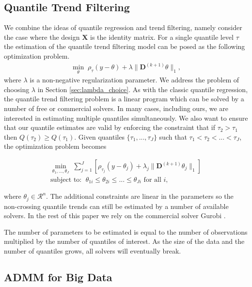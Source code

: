 \documentclass[12pt]{article}
\begin{document}
	\subsection{Quantile Trend Filtering}
	
	We combine the ideas of quantile regression and trend filtering, namely consider the case where the design $\mathbf{X}$ is the identity matrix. For a single quantile level $\tau$ the estimation of the quantile trend filtering model can be posed as the following optimization problem.
	\begin{eqnarray}
	\label{eq:quantile_trend}
	\underset{\theta}{\min}\; \rho_\tau(y - \theta) + \lambda \lVert \mathbf{D}^{(k+1)} \theta \rVert_1,
	\end{eqnarray}
	where $\lambda$ is a non-negative regularization parameter. We address the problem of choosing $\lambda$ in Section \ref{sec:lambda_choice}. As with the classic quantile regression, the quantile trend filtering problem is a linear program which can be solved by a number of free or commercial solvers. In many cases, including ours, we are interested in estimating multiple quantiles simultaneously. We also want to ensure that our quantile estimates are valid by enforcing the constraint that if $\tau_2 > \tau_1$ then $Q(\tau_2) \ge Q(\tau_1)$. Given quantiles $\{\tau_1, ..., \tau_J\}$ such that $\tau_1 < \tau_2 < ... < \tau_J$, the optimization problem becomes 
	
	\begin{eqnarray}
	\label{eq:noncross_trend}
	\underset{\theta_1, ..., \theta_J}{\min}\; \sum_{j=1}^J \left [\rho_{\tau_j}(y - \theta_{j}) + 
	\lambda_j \lVert \mathbf{D}^{(k+1)} \theta_j \rVert_1 \right ] \\
	 \text{subject to: }\; \theta_{1i} \le \theta_{2i} \le ... \le \theta_{Ji} \text{ for all } i,
	\end{eqnarray}
	
	where $\theta_j \in \mathcal{R}^n$. The additional constraints are linear in the parameters so the non-crossing quantile trends can still be estimated by a number of available solvers. In the rest of this paper we rely on the commercial solver Gurobi \citep{gurobi}. 
	
	The number of parameters to be estimated is equal to the number of observations multiplied by the number of quantiles of interest. As the size of the data and the number of quantiles grows, all solvers will eventually break. 
	
	\subsection{ADMM for Big Data}
	
\end{document}
